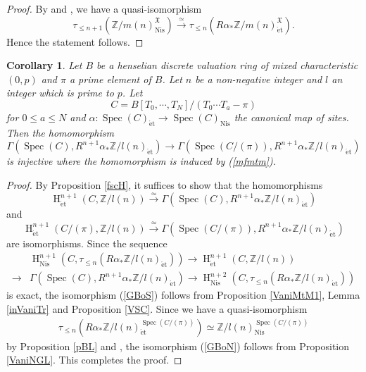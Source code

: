 \documentclass{article}
\newtheorem{cor}[thm]{\indent \sc Corollary}
\newcommand{\spec}{\operatorname{Spec}}
\newcommand{\et}{\mathrm{\acute{e}t}}
\newcommand{\Nis}{\mathrm{Nis}}
\newcommand{\HO}{\operatorname{H}}
\begin{document}
%
\begin{proof}\upshape
By \cite[p.37, Corollary 7]{SM19} and \cite[Proposition 4.5]{Sak4},
we have a quasi-isomorphism
%
\begin{equation*}
\tau_{\leq n+1}\left(
\mathbb{Z}/m(n)_{\Nis}^{\mathfrak{X}}
\right)
\xrightarrow{\simeq}
\tau_{\leq n}\left(
R\alpha_{*}\mathbb{Z}/m(n)_{\et}^{\mathfrak{X}}
\right).
\end{equation*}
%
Hence the statement follows.
\end{proof}
%

%
\begin{cor}\upshape\label{inclaffmt}
Let $B$ be a henselian discrete valuation ring of mixed characteristic $(0, p)$ and
$\pi$ a prime element of $B$. Let $n$ be a non-negative integer and 
$l$ an integer which is prime to $p$.
Let 
%
\begin{equation*}
C=
B[T_{0}, \cdots, T_{N}]/
(T_{0}\cdots T_{a}-\pi)
\end{equation*}
%
for 
$0\leq a\leq N$
and
$\alpha: \spec(C)_{\et}\to \spec(C)_{\Nis}$
the canonical map of sites. Then the homomorphism
%
\begin{equation*}
\Gamma\left(
\spec(C),
R^{n+1}\alpha_{*}\mathbb{Z}/l(n)_{\et}
\right)
\to
\Gamma\left(
\spec(C/(\pi)),
R^{n+1}\alpha_{*}\mathbb{Z}/l(n)_{\et}
\right)
\end{equation*}
%
is injective where the homomorphism is induced by (\ref{mfmtm}).
\end{cor}
%

%
\begin{proof}\upshape
By Proposition \ref{fscH}, it suffices to show that 
the homomorphisms
%
\begin{equation}\label{GBoS}
\HO^{n+1}_{\et}(
C,
\mathbb{Z}/l(n)
)    
\xrightarrow{\simeq}
\Gamma\left(
\spec(C),
R^{n+1}\alpha_{*}
\mathbb{Z}/l(n)_{\et}
\right)
\end{equation}
%
and
%
\begin{equation}\label{GBoN}
\HO^{n+1}_{\et}(
C/(\pi),
\mathbb{Z}/l(n)
)    
\xrightarrow{\simeq}
\Gamma\left(
\spec(C/(\pi)),
R^{n+1}\alpha_{*}
\mathbb{Z}/l(n)_{\et}
\right)
\end{equation}
%
are isomorphisms. Since the sequence
%
\begin{align*}
&\HO^{n+1}_{\Nis}\left(
C,
\tau_{\leq n}(
R\alpha_{*}\mathbb{Z}/l(n)_{\et}
)
\right)
\to
\HO^{n+1}_{\et}(
C,
\mathbb{Z}/l(n)
)
\\
\to
&\Gamma\left(
\spec(C),
R^{n+1}\alpha_{*}\mathbb{Z}/l(n)_{\et}
\right) 
\to 
\HO^{n+2}_{\Nis}\left(
C,
\tau_{\leq n}(
R\alpha_{*}\mathbb{Z}/l(n)_{\et}
)
\right)
\end{align*}
%
is exact, the isomorphism (\ref{GBoS}) follows 
from Proposition \ref{VaniMtM1}, Lemma \ref{inVaniTr} and Proposition \ref{VSC}.
Since we have a quasi-isomorphism
%
\begin{align*}
\tau_{\leq n}\left(
R\alpha_{*}\mathbb{Z}/l(n)_{\et}^{\spec(C/(\pi))}
\right)
\simeq
\mathbb{Z}/l(n)_{\Nis}^{\spec(C/(\pi))}
\end{align*}
%
by Proposition \ref{pBL} and \cite[Proposition 2.1]{Sak4},
the isomorphism (\ref{GBoN})
follows from  Proposition \ref{VaniNGL}.
This completes the proof.
\end{proof}
%
\end{document}
